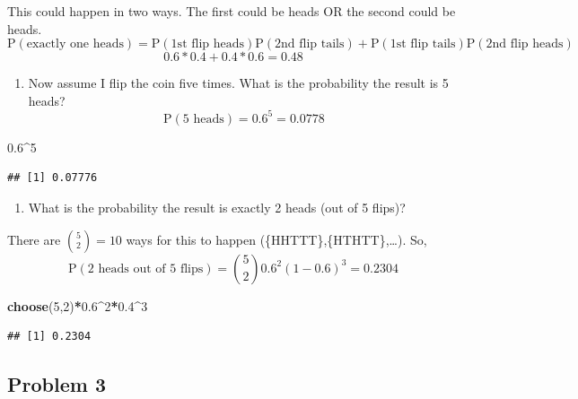 \documentclass[
]{book}
\newenvironment{Shaded}{\begin{snugshade}}{\end{snugshade}}
\newcommand{\DecValTok}[1]{\textcolor[rgb]{0.00,0.00,0.81}{#1}}
\newcommand{\FloatTok}[1]{\textcolor[rgb]{0.00,0.00,0.81}{#1}}
\newcommand{\KeywordTok}[1]{\textcolor[rgb]{0.13,0.29,0.53}{\textbf{#1}}}
\newcommand{\NormalTok}[1]{#1}
\newcommand{\OperatorTok}[1]{\textcolor[rgb]{0.81,0.36,0.00}{\textbf{#1}}}
\providecommand{\tightlist}{%
  \setlength{\itemsep}{0pt}\setlength{\parskip}{0pt}}
\begin{document}
This could happen in two ways. The first could be heads OR the second could be heads.
\[
\mbox{P}(\mbox{exactly one heads})=\mbox{P}(\mbox{1st flip heads})\mbox{P}(\mbox{2nd flip tails}) + \mbox{P}(\mbox{1st flip tails})\mbox{P}(\mbox{2nd flip heads})
\]
\[
0.6*0.4+0.4*0.6 = 0.48
\]

\begin{enumerate}
\def\labelenumi{\alph{enumi}.}
\setcounter{enumi}{4}
\tightlist
\item
  Now assume I flip the coin five times. What is the probability the result is 5 heads?
  \[
  \mbox{P}(\mbox{5 heads})= 0.6^5 = 0.0778
  \]
\end{enumerate}

\begin{Shaded}
\begin{Highlighting}[]
\FloatTok{0.6}\OperatorTok{^}\DecValTok{5}
\end{Highlighting}
\end{Shaded}

\begin{verbatim}
## [1] 0.07776
\end{verbatim}

\begin{enumerate}
\def\labelenumi{\alph{enumi}.}
\setcounter{enumi}{5}
\tightlist
\item
  What is the probability the result is exactly 2 heads (out of 5 flips)?
\end{enumerate}

There are \(\binom{5}{2} = 10\) ways for this to happen (\{HHTTT\},\{HTHTT\},\ldots). So,
\[
\mbox{P}(\mbox{2 heads out of 5 flips})=\binom{5}{2} 0.6^2(1-0.6)^3 = 0.2304
\]

\begin{Shaded}
\begin{Highlighting}[]
\KeywordTok{choose}\NormalTok{(}\DecValTok{5}\NormalTok{,}\DecValTok{2}\NormalTok{)}\OperatorTok{*}\FloatTok{0.6}\OperatorTok{^}\DecValTok{2}\OperatorTok{*}\FloatTok{0.4}\OperatorTok{^}\DecValTok{3}
\end{Highlighting}
\end{Shaded}

\begin{verbatim}
## [1] 0.2304
\end{verbatim}

\hypertarget{problem-3-5}{%
\subsection{Problem 3}\label{problem-3-5}}
\end{document}
